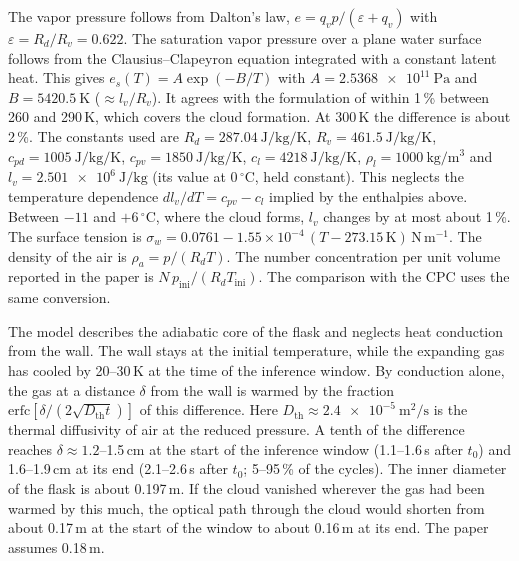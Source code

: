 \documentclass[12pt]{article}
\begin{document}
The vapor pressure follows from Dalton's law, $e = q_v p/(\varepsilon + q_v)$ with
$\varepsilon = R_d/R_v = 0.622$. The saturation vapor pressure over a plane water surface follows from the
Clausius--Clapeyron equation \citep[Eq.~4-83]{pruppacher1997microphysics} integrated with a constant latent
heat. This gives $e_s(T) = A\exp(-B/T)$ with $A = \SI{2.5368e11}{\pascal}$ and $B = \SI{5420.5}{\kelvin}$
($\approx l_v/R_v$). It agrees with the formulation of \citet{murphy2005review} within 1\,\% between
260 and 290\,K, which covers the cloud formation. At 300\,K the difference is about 2\,\%. The constants
used are
$R_d = \SI{287.04}{\joule\per\kilogram\per\kelvin}$, $R_v = \SI{461.5}{\joule\per\kilogram\per\kelvin}$,
$c_{pd} = \SI{1005}{\joule\per\kilogram\per\kelvin}$, $c_{pv} = \SI{1850}{\joule\per\kilogram\per\kelvin}$,
$c_l = \SI{4218}{\joule\per\kilogram\per\kelvin}$, $\rho_l = \SI{1000}{\kilogram\per\cubic\meter}$ and
$l_v = \SI{2.501e6}{\joule\per\kilogram}$ (its value at 0\,$^\circ$C, held constant). This neglects the
temperature dependence
$dl_v/dT = c_{pv} - c_l$ implied by the enthalpies above. Between $-11$ and $+6$\,$^\circ$C, where the cloud
forms, $l_v$ changes by at most about 1\,\%.
The surface tension is $\sigma_w = 0.0761 - 1.55\times10^{-4}\,(T - 273.15\,\mathrm{K})$\,N\,m$^{-1}$.
The density of the air is $\rho_a = p/(R_d T)$. The number concentration per unit volume reported in the
paper is $N\,p_\mathrm{ini}/(R_d T_\mathrm{ini})$. The comparison with the CPC uses the same conversion.

The model describes the adiabatic core of the flask and neglects heat conduction from the wall. The wall
stays at the initial temperature, while the expanding gas has cooled by 20--30\,K
at the time of the inference window. By conduction alone, the gas at a distance $\delta$ from the wall is
warmed by the fraction $\mathrm{erfc}[\delta/(2\sqrt{D_\mathrm{th} t})]$ of this difference. Here
$D_\mathrm{th} \approx \SI{2.4e-5}{\square\meter\per\second}$ is the thermal diffusivity of air at the
reduced pressure.
A tenth
of the difference reaches $\delta \approx 1.2$--1.5\,cm at the start of the inference window
(1.1--1.6\,s after $t_0$) and 1.6--1.9\,cm at its end (2.1--2.6\,s after $t_0$; 5--95\,\% of the
cycles). The inner diameter of the flask is about 0.197\,m. If the cloud vanished wherever the gas had been
warmed by this much, the optical path through the cloud would shorten from about 0.17\,m at the start of the
window to about 0.16\,m at its end. The paper assumes 0.18\,m.
\end{document}
